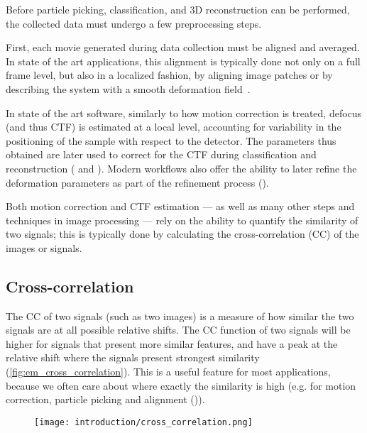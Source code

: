 Before particle picking, classification, and 3D reconstruction can be performed, the collected data must undergo a few preprocessing steps.

First, each movie generated during data collection must be aligned and averaged.
In state of the art applications, this alignment is typically done not only on a full frame level, but also in a localized fashion, by aligning image patches or by describing the system with a smooth deformation field~\cite{zhengMotionCor2AnisotropicCorrection2017,punjaniCryoSPARCAlgorithmsRapid2017,tegunovRealtimeCryoelectronMicroscopy2019}.

In state of the art software, similarly to how motion correction is treated, defocus (and thus CTF) is estimated at a local level, accounting for variability in the positioning of the sample with respect to the detector.
The parameters thus obtained are later used to correct for the CTF during classification and reconstruction ( and ).
Modern workflows also offer the ability to later refine the deformation parameters as part of the refinement process ().

Both motion correction and CTF estimation --- as well as many other steps and techniques in image processing --- rely on the ability to quantify the similarity of two signals; this is typically done by calculating the cross-correlation (CC) of the images or signals.

\subsection{Cross-correlation}\label{em_cross_correlation}

The CC of two signals (such as two images) is a measure of how similar the two signals are at all possible relative shifts.
The CC function of two signals will be higher for signals that present more similar features, and have a peak at the relative shift where the signals present strongest similarity (\autoref{fig:em_cross_correlation}).
This is a useful feature for most applications, because we often care about where exactly the similarity is high (e.g. for motion correction, particle picking and alignment ()).

\begin{figure}[ht]
    \centering
    \texttt{[image: introduction/cross\_correlation.png]}
    \label{fig:em_cross_correlation}
\end{figure}

